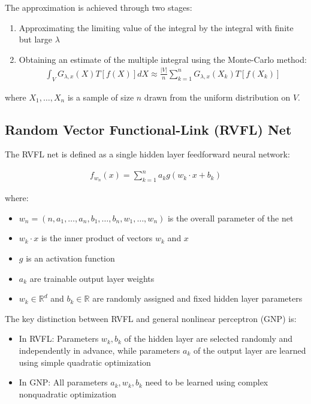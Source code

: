 \documentclass[11pt]{article}
\begin{document}
The approximation is achieved through two stages:
\begin{enumerate}
    \item Approximating the limiting value of the integral by the integral with finite but large $\lambda$
    \item Obtaining an estimate of the multiple integral using the Monte-Carlo method:
    \begin{align}
    \int_V G_{\lambda,x}(X)T[f(X)]dX \approx \frac{|V|}{n}\sum_{k=1}^n G_{\lambda,x}(X_k)T[f(X_k)]
    \end{align}
\end{enumerate}

where $X_1, \ldots, X_n$ is a sample of size $n$ drawn from the uniform distribution on $V$.

\subsection{Random Vector Functional-Link (RVFL) Net}

The RVFL net is defined as a single hidden layer feedforward neural network:

\begin{align}
f_{w_n}(x) = \sum_{k=1}^n a_k g(w_k \cdot x + b_k)
\end{align}

where:
\begin{itemize}
    \item $w_n = (n, a_1, \ldots, a_n, b_1, \ldots, b_n, w_1, \ldots, w_n)$ is the overall parameter of the net
    \item $w_k \cdot x$ is the inner product of vectors $w_k$ and $x$
    \item $g$ is an activation function
    \item $a_k$ are trainable output layer weights
    \item $w_k \in \mathbb{R}^d$ and $b_k \in \mathbb{R}$ are randomly assigned and fixed hidden layer parameters
\end{itemize}

The key distinction between RVFL and general nonlinear perceptron (GNP) is:
\begin{itemize}
    \item In RVFL: Parameters $w_k, b_k$ of the hidden layer are selected randomly and independently in advance, while parameters $a_k$ of the output layer are learned using simple quadratic optimization
    \item In GNP: All parameters $a_k, w_k, b_k$ need to be learned using complex nonquadratic optimization
\end{itemize}
\end{document}
